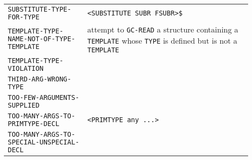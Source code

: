 \documentclass[a4paper,]{article}
\begin{document}
\begin{longtable}[]{@{}ll@{}}
\begin{minipage}[t]{0.58\columnwidth}
\texttt{SUBSTITUTE-TYPE-FOR-TYPE}\strut
\end{minipage} & \begin{minipage}[t]{0.36\columnwidth}\raggedright\strut
\texttt{\textless{}SUBSTITUTE\ SUBR\ FSUBR\textgreater{}\$}\strut
\end{minipage}\tabularnewline
\begin{minipage}[t]{0.58\columnwidth}\raggedright\strut
\texttt{TEMPLATE-TYPE-NAME-NOT-OF-TYPE-TEMPLATE}\strut
\end{minipage} & \begin{minipage}[t]{0.36\columnwidth}\raggedright\strut
attempt to \texttt{GC-READ} a structure containing a \texttt{TEMPLATE} whose \texttt{TYPE} is defined but is not a
\texttt{TEMPLATE}\strut
\end{minipage}\tabularnewline
\begin{minipage}[t]{0.58\columnwidth}\raggedright\strut
\texttt{TEMPLATE-TYPE-VIOLATION}\strut
\end{minipage} & \begin{minipage}[t]{0.36\columnwidth}\raggedright\strut
\strut
\end{minipage}\tabularnewline
\begin{minipage}[t]{0.58\columnwidth}\raggedright\strut
\texttt{THIRD-ARG-WRONG-TYPE}\strut
\end{minipage} & \begin{minipage}[t]{0.36\columnwidth}\raggedright\strut
\strut
\end{minipage}\tabularnewline
\begin{minipage}[t]{0.58\columnwidth}\raggedright\strut
\texttt{TOO-FEW-ARGUMENTS-SUPPLIED}\strut
\end{minipage} & \begin{minipage}[t]{0.36\columnwidth}\raggedright\strut
\strut
\end{minipage}\tabularnewline
\begin{minipage}[t]{0.58\columnwidth}\raggedright\strut
\texttt{TOO-MANY-ARGS-TO-PRIMTYPE-DECL}\strut
\end{minipage} & \begin{minipage}[t]{0.36\columnwidth}\raggedright\strut
\texttt{\textless{}PRIMTYPE\ any\ ...\textgreater{}}\strut
\end{minipage}\tabularnewline
\begin{minipage}[t]{0.58\columnwidth}\raggedright\strut
\texttt{TOO-MANY-ARGS-TO-SPECIAL-UNSPECIAL-DECL}\strut
\end{minipage} & \begin{minipage}[t]{0.36\columnwidth}\raggedright\strut

\end{minipage}
\end{longtable}
\end{document}
